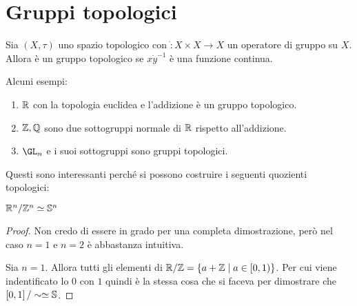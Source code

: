 \section{Gruppi topologici}

\begin{definition}
	Sia $(X, \tau)$ uno spazio topologico con $\dot \colon X \times X \rightarrow X$ un operatore di gruppo su $X$. Allora è un gruppo topologico se $x \dot y^{-1}$ è una funzione continua.
\end{definition}

Alcuni esempi:
\begin{enumerate}
	\item $\R$ con la topologia euclidea e l'addizione è un gruppo topologico.
	\item $\Z, \Q$ sono due sottogruppi normale di $\R$ rispetto all'addizione. 
	\item $\GL_n$ e i suoi sottogruppi sono gruppi topologici.
\end{enumerate}

Questi sono interessanti perché si possono costruire i seguenti quozienti topologici:
\begin{theorem}
	$\R^n / \Z^n \simeq \S^n$
\end{theorem}
\begin{proof}
	Non credo di essere in grado per una completa dimostrazione, però nel caso $n=1$ e $n=2$ è abbastanza intuitiva.
	
	Sia $n=1$. Allora tutti gli elementi di $\R / \Z = \{a + \Z \; |\; a \in \left[0,1\right) \}$.  
	Per cui viene indentificato lo $0$ con $1$ quindi è la stessa cosa che si faceva per dimostrare che $\left[0,1\right]/ \sim \simeq \S$. 
\end{proof}
